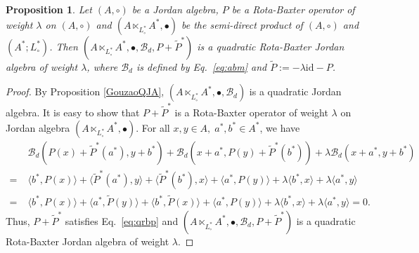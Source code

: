 \documentclass[12pt, reqno, a4paper]{amsart}
\newtheorem{proposition}[theorem]{Proposition}
\theoremstyle{definition}
\newcommand{\id}{\mathrm{id}}
\begin{document}
\begin{proposition}\label{exrbfna}
	Let $(A, \circ)$ be a Jordan algebra, $P$ be a Rota-Baxter operator of weight $\lambda$ on $(A, \circ)$ and $(A \ltimes_{L_{\circ}^{*}} A^{*}, \bullet)$ be the semi-direct product of $(A, \circ)$ and $(A^*; L_{\circ}^*)$. 
	Then $(A \ltimes_{L_{\circ}^{*}} A^{*}, \bullet , \mathcal{B}_d, P+\tilde{P}^{*})$ is a quadratic Rota-Baxter Jordan algebra of weight $\lambda$, where $\mathcal{B}_d$ is defined by Eq.~\eqref{eq:abm} and $\tilde{P} := - \lambda \id - P$.
\end{proposition}
\begin{proof}
	By Proposition \ref{GouzaoQJA}, $( A \ltimes_{L_{\circ}^{*}} A^{*}, \bullet , \mathcal{B}_d)$ is a quadratic Jordan algebra. 	
	It is easy to show that $P+\tilde{P}^{*}$ is a Rota-Baxter operator of weight $\lambda$ on Jordan algebra $(A \ltimes_{L_{\circ}^{*}} A^{*}, \bullet)$. 
	For all $x, y \in A, \; a^{*}, b^{*} \in A^{*}$, we have
	\begin{align*}
		&\mathcal{B}_{d}( P(x)+\tilde{P}^*{(a^{*})}, y+b^{*}) + \mathcal{B}_{d}( x+a^{*} , P(y)+\tilde{P}^*{(b^{*})}) + \lambda\mathcal{B}_{d}(x+a^{*}, y+b^{*}) \\
		=\; & \langle b^{*}, P(x) \rangle + \langle \tilde{P}^*{(a^{*})}, y \rangle + \langle \tilde{P}^*{(b^{*})}, x \rangle + \langle a^{*}, P(y) \rangle + \lambda\langle b^{*}, x \rangle + \lambda\langle a^{*}, y \rangle \\
		=\; & \langle b^{*}, P(x) \rangle + \langle a^{*}, \tilde{P}{(y)} \rangle + \langle b^{*}, \tilde{P}{(x)} \rangle + \langle a^{*}, P(y) \rangle + \lambda\langle b^{*}, x \rangle + \lambda\langle a^{*}, y \rangle = 0.
	\end{align*}
	Thus, $P+\tilde{P}^{*}$ satisfies Eq.~\eqref{eq:qrbp} and $(A \ltimes_{L_{\circ}^{*}} A^{*}, \bullet, \mathcal{B}_d, P+\tilde{P}^{*})$ is a quadratic Rota-Baxter Jordan algebra of weight $\lambda$.
\end{proof}
\end{document}
